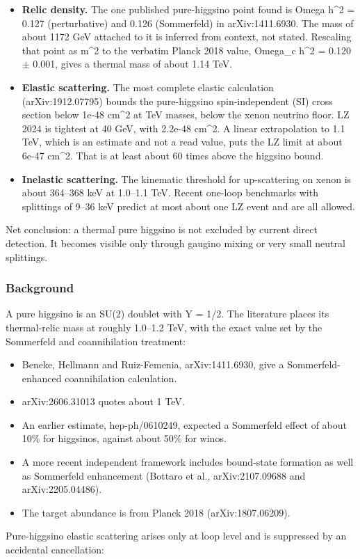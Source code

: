 \documentclass[11pt,a4paper]{article}
\begin{document}
\begin{itemize}
  \item \textbf{Relic density.} The one published pure-higgsino point found is Omega h\textasciicircum{}2 = 0.127 (perturbative) and 0.126 (Sommerfeld) in arXiv:1411.6930. The mass of about 1172 GeV attached to it is inferred from context, not stated. Rescaling that point as m\textasciicircum{}2 to the verbatim Planck 2018 value, Omega\_c h\textasciicircum{}2 = 0.120 $\pm$ 0.001, gives a thermal mass of about 1.14 TeV.
  \item \textbf{Elastic scattering.} The most complete elastic calculation (arXiv:1912.07795) bounds the pure-higgsino spin-independent (SI) cross section below 1e-48 cm\textasciicircum{}2 at TeV masses, below the xenon neutrino floor. LZ 2024 is tightest at 40 GeV, with 2.2e-48 cm\textasciicircum{}2. A linear extrapolation to 1.1 TeV, which is an estimate and not a read value, puts the LZ limit at about 6e-47 cm\textasciicircum{}2. That is at least about 60 times above the higgsino bound.
  \item \textbf{Inelastic scattering.} The kinematic threshold for up-scattering on xenon is about 364--368 keV at 1.0--1.1 TeV. Recent one-loop benchmarks with splittings of 9--36 keV predict at most about one LZ event and are all allowed.
\end{itemize}
Net conclusion: a thermal pure higgsino is not excluded by current direct detection. It becomes visible only through gaugino mixing or very small neutral splittings.

\subsubsection*{Background}
A pure higgsino is an SU(2) doublet with Y = 1/2. The literature places its thermal-relic mass at roughly 1.0--1.2 TeV, with the exact value set by the Sommerfeld and coannihilation treatment:

\begin{itemize}
  \item Beneke, Hellmann and Ruiz-Femenia, arXiv:1411.6930, give a Sommerfeld-enhanced coannihilation calculation.
  \item arXiv:2606.31013 quotes about 1 TeV.
  \item An earlier estimate, hep-ph/0610249, expected a Sommerfeld effect of about 10\% for higgsinos, against about 50\% for winos.
  \item A more recent independent framework includes bound-state formation as well as Sommerfeld enhancement (Bottaro et al., arXiv:2107.09688 and arXiv:2205.04486).
  \item The target abundance is from Planck 2018 (arXiv:1807.06209).
\end{itemize}
Pure-higgsino elastic scattering arises only at loop level and is suppressed by an accidental cancellation:
\end{document}
